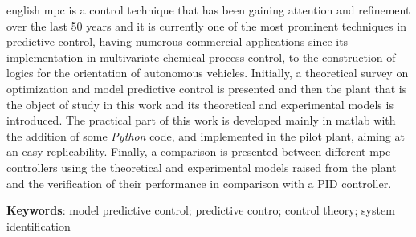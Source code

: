 \setlength{\absparsep}{18pt} %
\begin{resumo}[Abstract]
  \begin{otherlanguage*}{english}
    \acrshort{mpc} is a control technique that has been gaining attention and refinement over the last 50 years
    and it is currently one of the most prominent techniques in predictive control, having numerous
    commercial applications since its implementation in multivariate chemical process control,
    to the construction of logics for the orientation of autonomous vehicles.
    Initially, a theoretical survey on optimization and model predictive control is presented and then the plant
    that is the object of study in this work and its theoretical and experimental models is introduced.
    The practical part of this work is developed mainly in \acrshort{matlab} with the addition of some \textit{Python} code,
    and implemented in the pilot plant, aiming at an easy replicability.
    Finally, a comparison is presented between different \acrshort{mpc} controllers using the theoretical and experimental
    models raised from the plant and the verification of their performance in comparison with a PID controller.

    \vspace{\onelineskip}

    \noindent 
    \textbf{Keywords}: model predictive control; predictive contro; control theory; system identification
  \end{otherlanguage*}
\end{resumo}
